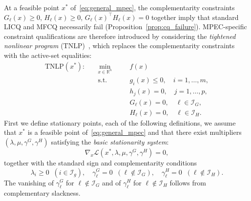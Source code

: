 At a feasible point $x^*$ of~\eqref{eq:general_mpec}, the
complementarity constraints $G_\ell(x) \geq 0$, $H_\ell(x) \geq 0$,
$G_\ell(x)^{\top} H_\ell(x) = 0$ together imply that standard LICQ and
MFCQ necessarily fail
(Proposition~\ref{prop:cq_failure}). MPEC-specific constraint
qualifications are therefore introduced by considering the
\emph{tightened nonlinear program} (TNLP)~\citep{ScheelScholtes2000},
which replaces the complementarity constraints with the active-set
equalities:
\begin{equation}
\begin{aligned}
  \text{TNLP}(x^*): \quad & \min_{x \in \mathbb{R}^n} \quad && f(x) \\
  & \text{s.t.} \quad && g_i(x) \leq 0, \quad i = 1, \ldots, m, \\
  & && h_j(x) = 0, \quad j = 1, \ldots, p, \\
  & && G_\ell(x) = 0, \quad \ell \in \mathcal{I}_G, \\
  & && H_\ell(x) = 0, \quad \ell \in \mathcal{I}_H.
\end{aligned}
\label{eq:tnlp}
\end{equation}
First we define stationary points, each of the following definitions, we assume that $x^*$ is a
feasible point of~\eqref{eq:general_mpec} and that there exist
multipliers $(\lambda, \mu, \gamma^G, \gamma^H)$ satisfying the
\emph{basic stationarity system}:
\begin{equation}
  \nabla_x \mathcal{L}(x^*, \lambda, \mu, \gamma^G, \gamma^H) = 0,
  \label{eq:stationarity_system}
\end{equation}
together with the standard sign and complementarity conditions
\[
  \lambda_i \geq 0 \;\; (i \in \mathcal{I}_g), \quad
  \gamma^G_\ell = 0 \;\; (\ell \notin \mathcal{I}_G), \quad
  \gamma^H_\ell = 0 \;\; (\ell \notin \mathcal{I}_H).
\]
The vanishing of $\gamma^G_\ell$ for $\ell \notin \mathcal{I}_G$ and of
$\gamma^H_\ell$ for $\ell \notin \mathcal{I}_H$ follows from
complementary slackness.


